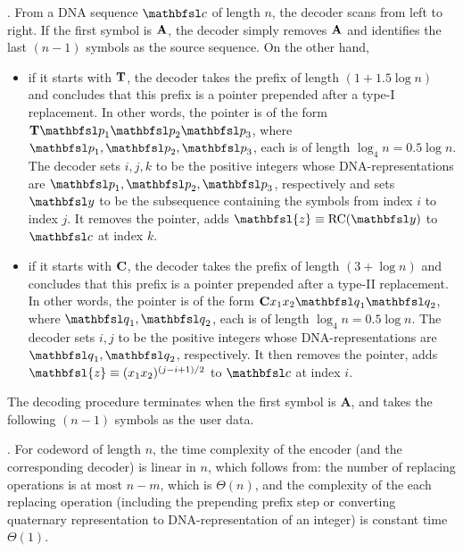 \documentclass[conference]{IEEEtran}
\theoremstyle{plain}
\theoremstyle{definition}
\newcommand{\bp}{{\mathbfsl p}}
\newcommand{\bq}{{\mathbfsl q}}
\newcommand{\by}{{\mathbfsl y}}
\newcommand{\bc}{{\mathbfsl c}}
\newcommand{\bz}{{\mathbfsl{z}}}
\newcommand{\dec}{\textsc{Dec}}
\begin{document}
\noindent{\bf Construction of $\dec_{{\rm SSA}}$}. From a DNA sequence $\bc$ of length $n$, the decoder scans from left to right. If the first symbol is ${\bf A}$, the decoder simply removes ${\bf A}$ and identifies the last $(n-1)$ symbols as the source sequence. On the other hand, 
\begin{itemize} 
\item if it starts with ${\bf T}$, the decoder takes the prefix of length $(1+1.5\log n)$ and concludes that this prefix is a pointer prepended after a type-I replacement. In other words, the pointer is of the form ${\bf T}\bp_1\bp_2\bp_3$, where $\bp_1,\bp_2,\bp_3$, each is of length $\log_4 n=0.5\log n$. The decoder sets $i, j, k$ to be the positive integers whose DNA-representations are $\bp_1,\bp_2,\bp_3$, respectively and sets $\by$ to be the subsequence containing the symbols from index $i$ to index $j$. It removes the pointer, adds $\bz \equiv {\rm RC}(\by)$ to $\bc$ at index $k$. 
\item if it starts with ${\bf C}$, the decoder takes the prefix of length $(3+\log n)$ and concludes that this prefix is a pointer prepended after a type-II replacement. In other words, the pointer is of the form ${\bf C}x_1x_2\bq_1\bq_2$, where $\bq_1,\bq_2$, each is of length $\log_4 n=0.5\log n$. The decoder sets $i, j$ to be the positive integers whose DNA-representations are $\bq_1,\bq_2$, respectively. It then removes the pointer, adds $\bz \equiv (x_1x_2)^{(j-i+1)/2}$ to $\bc$ at index $i$. 
\end{itemize}
The decoding procedure terminates when the first symbol is {\bf A}, and takes the following $(n-1)$ symbols as the user data.
\vspace{0.05in} 

. For codeword of length $n$, the time complexity of the encoder (and the corresponding decoder) is linear in $n$, which follows from: the number of replacing operations is at most $n-m$, which is $\Theta(n)$, and the complexity of the each replacing operation (including the prepending prefix step or converting quaternary representation to DNA-representation of an integer) is constant time $\Theta(1)$. %
\end{document}
